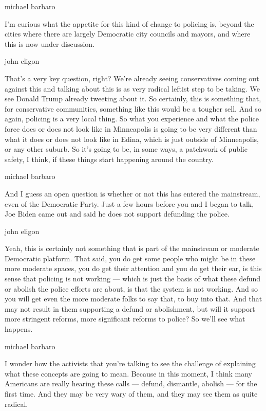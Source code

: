 michael barbaro

I'm curious what the appetite for this kind of change to policing is,
beyond the cities where there are largely Democratic city councils and
mayors, and where this is now under discussion.

john eligon

That's a very key question, right? We're already seeing conservatives
coming out against this and talking about this is as very radical
leftist step to be taking. We see Donald Trump already tweeting about
it. So certainly, this is something that, for conservative communities,
something like this would be a tougher sell. And so again, policing is a
very local thing. So what you experience and what the police force does
or does not look like in Minneapolis is going to be very different than
what it does or does not look like in Edina, which is just outside of
Minneapolis, or any other suburb. So it's going to be, in some ways, a
patchwork of public safety, I think, if these things start happening
around the country.

michael barbaro

And I guess an open question is whether or not this has entered the
mainstream, even of the Democratic Party. Just a few hours before you
and I began to talk, Joe Biden came out and said he does not support
defunding the police.

john eligon

Yeah, this is certainly not something that is part of the mainstream or
moderate Democratic platform. That said, you do get some people who
might be in these more moderate spaces, you do get their attention and
you do get their ear, is this sense that policing is not working ---
which is just the basis of what these defund or abolish the police
efforts are about, is that the system is not working. And so you will
get even the more moderate folks to say that, to buy into that. And that
may not result in them supporting a defund or abolishment, but will it
support more stringent reforms, more significant reforms to police? So
we'll see what happens.

michael barbaro

I wonder how the activists that you're talking to see the challenge of
explaining what these concepts are going to mean. Because in this
moment, I think many Americans are really hearing these calls ---
defund, dismantle, abolish --- for the first time. And they may be very
wary of them, and they may see them as quite radical.

